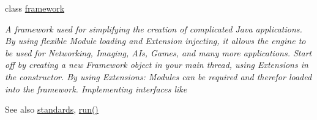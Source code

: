 \begin{DoxyCompactItemize}
class \hyperlink{classflounder_1_1framework}{framework}
\begin{DoxyCompactList}\small\item\em A framework used for simplifying the creation of complicated Java applications. By using flexible Module loading and Extension injecting, it allows the engine to be used for Networking, Imaging, A\+Is, Games, and many more applications. Start off by creating a new Framework object in your main thread, using Extensions in the constructor. By using Extensions\+: Modules can be required and therefor loaded into the framework. Implementing interfaces like \begin{DoxySeeAlso}{See also}
\hyperlink{classflounder_1_1standards}{standards}, \hyperlink{classflounder_1_1framework_aa3a73c8e8f5f0c6ccef3e4de89982434}{run()}



\end{DoxySeeAlso}
\end{DoxyCompactList}
\end{DoxyCompactItemize}
